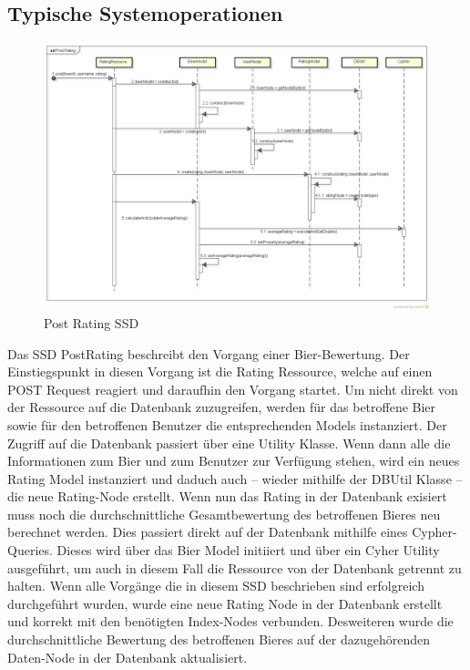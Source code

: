 \documentclass[10pt,a4paper]{scrartcl}
\begin{document}
\subsection{Typische Systemoperationen}
\begin{figure}[H]
	\includegraphics[height=\textwidth,angle=90]{PostRatingSSD.png}
	\caption{Post Rating SSD}
	\label{fig:post_rating_ssd}
\end{figure}

Das SSD PostRating beschreibt den Vorgang einer Bier-Bewertung. Der Einstiegspunkt in diesen
Vorgang ist die Rating Ressource, welche auf einen POST Request reagiert und daraufhin den Vorgang
startet. Um nicht direkt von der Ressource auf die Datenbank zuzugreifen, werden für das betroffene
Bier sowie für den betroffenen Benutzer die entsprechenden Models instanziert. Der Zugriff auf die
Datenbank passiert über eine Utility Klasse.
Wenn dann alle die Informationen zum Bier und zum Benutzer zur Verfügung stehen, wird ein neues
Rating Model instanziert und daduch auch -- wieder mithilfe der DBUtil Klasse -- die neue
Rating-Node erstellt. Wenn nun das Rating in der Datenbank exisiert muss noch die durchschnittliche
Gesamtbewertung des betroffenen Bieres neu berechnet werden. Dies passiert direkt auf der Datenbank
mithilfe eines Cypher-Queries. Dieses wird über das Bier Model initiiert und über ein Cyher Utility
ausgeführt, um auch in diesem Fall die Ressource von der Datenbank getrennt zu halten.
Wenn alle Vorgänge die in diesem SSD beschrieben sind erfolgreich durchgeführt wurden, wurde eine
neue Rating Node in der Datenbank erstellt und korrekt mit den benötigten Index-Nodes verbunden.
Desweiteren wurde die durchschnittliche Bewertung des betroffenen Bieres auf der dazugehörenden
Daten-Node in der Datenbank aktualisiert.
\end{document}
